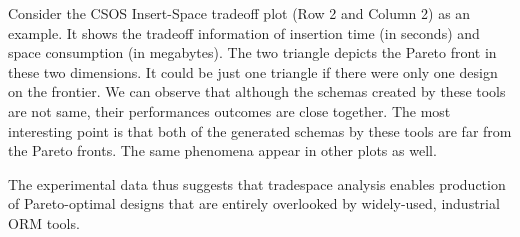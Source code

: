 \documentclass[10pt,conference]{IEEEtran}
\begin{document}
Consider the CSOS Insert-Space tradeoff plot (Row 2 and Column 2) as an example. It shows the tradeoff information of insertion time (in seconds) and space consumption (in megabytes). The two triangle depicts the Pareto front in these two dimensions. It could be just one triangle if there were only one design on the frontier. We can observe that although the schemas created by these tools are not same, their performances outcomes are close together. The most interesting point is that both of the generated schemas by these tools are far from the Pareto fronts. The same phenomena appear in other plots as well. 


The experimental data thus suggests that \@approach tradespace analysis enables production of Pareto-optimal designs that are entirely overlooked by widely-used, industrial ORM tools. 
 
 
\end{document}

